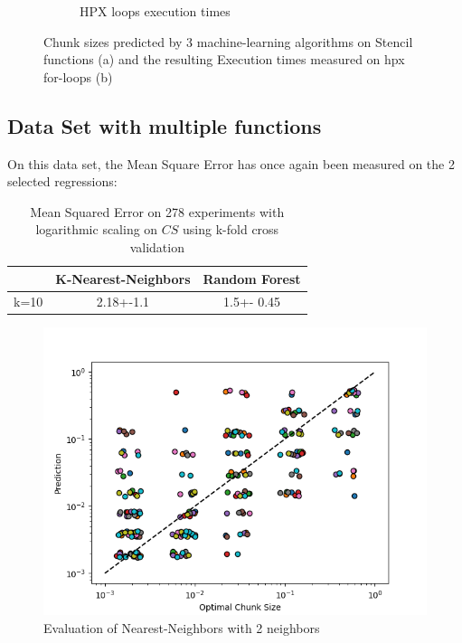\begin{figure}[h]
\begin{subfigure}[b]{0.49\textwidth}
		\caption[]%
		{{HPX loops execution times}}    
	\end{subfigure}
	\caption{Chunk sizes predicted by 3 machine-learning algorithms on Stencil functions (a) and the resulting Execution times measured on hpx for-loops (b)} 
\end{figure}
\subsection{Data Set with multiple functions}

On this data set, the Mean Square Error has once again been measured on the 2 selected regressions:

\begin{table}[h]
	\centering
	\caption{Mean Squared Error on 278 experiments with logarithmic scaling on $CS$ using k-fold cross validation}
	\label{my-label}
	\begin{tabular}{|c|c|c|}
		\hline
		& K-Nearest-Neighbors & Random Forest \\ \hline
		k=10  & 2.18+-1.1        & 1.5+- 0.45 \\ \hline
	\end{tabular}
\end{table}
\begin{figure}[H]
	\centering
	\includegraphics[width=120mm]{images/KNNR_eval_big.png}
	\caption{Evaluation of Nearest-Neighbors with 2 neighbors}
\end{figure}

